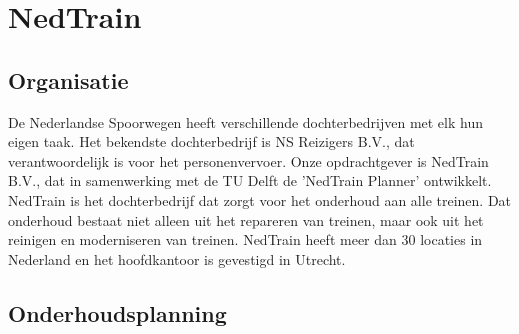 \section{NedTrain}

\subsection{Organisatie}
De Nederlandse Spoorwegen heeft verschillende dochterbedrijven met elk hun eigen taak. Het bekendste dochterbedrijf is NS Reizigers B.V., dat verantwoordelijk is voor het personenvervoer. Onze opdrachtgever is NedTrain B.V., dat in samenwerking met de TU Delft de 'NedTrain Planner' ontwikkelt. NedTrain is het dochterbedrijf dat zorgt voor het onderhoud aan alle treinen. Dat onderhoud bestaat niet alleen uit het repareren van treinen, maar ook uit het reinigen en moderniseren van treinen. NedTrain heeft meer dan 30 locaties in Nederland en het hoofdkantoor is gevestigd in Utrecht. 

\subsection{Onderhoudsplanning}
